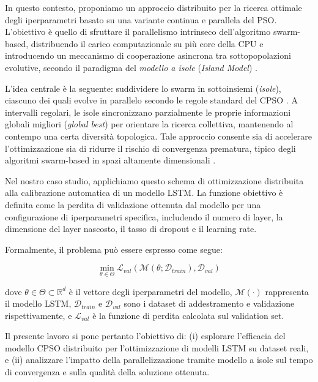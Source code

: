 \documentclass{article}
\begin{document}
In questo contesto, proponiamo un approccio distribuito per la ricerca ottimale degli iperparametri basato su una variante continua e parallela del PSO. L'obiettivo è quello di sfruttare il parallelismo intrinseco dell'algoritmo swarm-based, distribuendo il carico computazionale su più core della CPU e introducendo un meccanismo di cooperazione asincrona tra sottopopolazioni evolutive, secondo il paradigma del \textit{modello a isole} (\textit{Island Model}) \cite{cantupaz1998survey, tomassini2005spatially}.

L'idea centrale è la seguente: suddividere lo swarm in sottoinsiemi (\textit{isole}), ciascuno dei quali evolve in parallelo secondo le regole standard del CPSO \cite{professoressa}. A intervalli regolari, le isole sincronizzano parzialmente le proprie informazioni globali migliori (\textit{global best}) per orientare la ricerca collettiva, mantenendo al contempo una certa diversità topologica. Tale approccio consente sia di accelerare l'ottimizzazione sia di ridurre il rischio di convergenza prematura, tipico degli algoritmi swarm-based in spazi altamente dimensionali \cite{omran2005dynamic}.

Nel nostro caso studio, applichiamo questo schema di ottimizzazione distribuita alla calibrazione automatica di un modello LSTM. La funzione obiettivo è definita come la perdita di validazione ottenuta dal modello per una configurazione di iperparametri specifica, includendo il numero di layer, la dimensione del layer nascosto, il tasso di dropout e il learning rate.

Formalmente, il problema può essere espresso come segue:

\begin{equation}
\min_{\theta \in \Theta} \mathcal{L}_{val}(\mathcal{M}(\theta; \mathcal{D}_{train}), \mathcal{D}_{val})
\end{equation}

dove $\theta \in \Theta \subset \mathbb{R}^d$ è il vettore degli iperparametri del modello, $\mathcal{M}(\cdot)$ rappresenta il modello LSTM, $\mathcal{D}_{train}$ e $\mathcal{D}_{val}$ sono i dataset di addestramento e validazione rispettivamente, e $\mathcal{L}_{val}$ è la funzione di perdita calcolata sul validation set.

Il presente lavoro si pone pertanto l'obiettivo di: (i) esplorare l’efficacia del modello CPSO distribuito per l’ottimizzazione di modelli LSTM su dataset reali, e (ii) analizzare l’impatto della parallelizzazione tramite modello a isole sul tempo di convergenza e sulla qualità della soluzione ottenuta.
\end{document}
